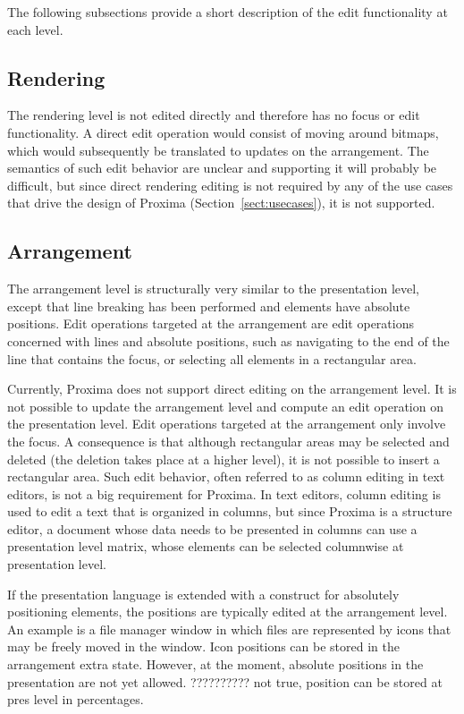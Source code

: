 The following subsections provide a short description of the edit functionality at each level. 
 
 
%																
\subsection{Rendering}

The rendering level is not edited directly and therefore has no focus or edit functionality. A direct edit operation would consist of moving around bitmaps, which would subsequently be translated to updates on the arrangement. The semantics of such edit behavior are unclear and supporting it will probably be difficult, but since direct rendering editing is not required by any of the use cases that drive the design of Proxima (Section~\ref{sect:usecases}), it is not supported.
  

%																
\subsection{Arrangement}\label{sect:editArr} 

The arrangement level is structurally very similar to the presentation level, except that line breaking has been performed and elements have absolute positions. Edit operations targeted at the arrangement are edit operations concerned with lines and absolute positions, such as navigating to the end of the line that contains the focus, or selecting all elements in a rectangular area.

Currently, Proxima does not support direct editing on the arrangement level. It is not possible to update the arrangement level and compute an edit operation on the presentation level. Edit operations targeted at the arrangement only involve the focus. A consequence is that although rectangular areas may be selected and deleted (the deletion takes place at a higher level), it is not possible to insert a rectangular area. Such edit behavior, often referred to as column editing in text editors, is not a big requirement for Proxima. In text editors, column editing is used to edit a text that is organized in columns, but since Proxima is a structure editor, a document whose data needs to be presented in columns can use a presentation level matrix, whose elements can be selected columnwise at presentation level.

\bc
If the presentation language is extended with a construct for absolutely positioning elements, the positions are typically edited at the arrangement level. An example is a  file manager window in which files are represented by icons that may be freely moved in  the window. Icon positions can be stored in the arrangement extra state. However, at the  moment, absolute positions in the presentation are not yet allowed. 
?????????? not true, position can be stored at pres level in percentages.
\ec

